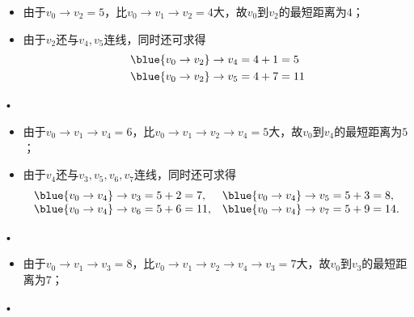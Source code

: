 \begin{frame}\ft{\subsubsecname}
\begin{figure}
\centering

\end{figure}

\begin{itemize}
\item
由于$v_0\to v_2=5$，比$v_0\to v_1 \to v_2=4$大，故$v_0$到$v_2$的最短距离为$4$；\\[0.1in]
\item
由于$v_2$还与$v_4,v_5$连线，同时还可求得
$$
\begin{aligned}
&\blue{v_0\to v_2} \to v_4=4+1=5\\
&\blue{v_0\to v_2} \to v_5=4+7=11
\end{aligned}
$$

\end{itemize}•

\end{frame}

\begin{frame}\ft{\subsubsecname}
\begin{figure}
\centering

\end{figure}

\begin{itemize}
\item
由于$v_0\to v_1\to v_4=6$，比$v_0\to v_1 \to v_2 \to v_4=5$大，故$v_0$到$v_4$的最短距离为$5$；\\[0.1in]
\item
由于$v_4$还与$v_3,v_5,v_6,v_7$连线，同时还可求得
$$
\begin{array}{ll}
 \blue{v_0\to v_4} \to v_3=5+2=7,   
&\blue{v_0\to v_4} \to v_5=5+3=8, \\
 \blue{v_0\to v_4} \to v_6=5+6=11,   
&\blue{v_0\to v_4} \to v_7=5+9=14.
\end{array}
$$

\end{itemize}•

\end{frame}

\begin{frame}\ft{\subsubsecname}
\begin{figure}
\centering

\end{figure}

\begin{itemize}
\item
由于$v_0\to v_1\to v_3=8$，比$v_0\to v_1 \to v_2 \to v_4 \to v_3=7$大，故$v_0$到$v_3$的最短距离为$7$；\\[0.1in]

\end{itemize}•
\end{frame}




